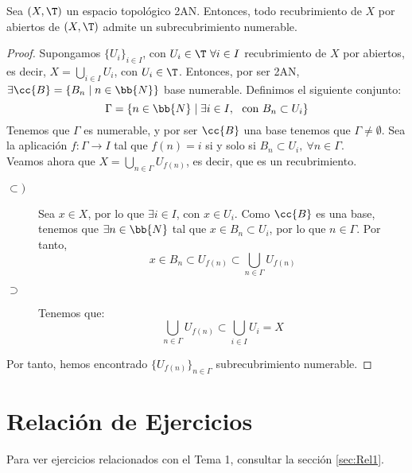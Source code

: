 \begin{prop}
    Sea $(X,\T)$ un espacio topológico 2AN. Entonces, todo recubrimiento de $X$ por abiertos de $(X,\T)$ admite un subrecubrimiento numerable.
\end{prop}
\begin{proof}
    Supongamos $\{U_i\}_{i\in I}$, con $U_i\in \T~\forall i\in I$ recubrimiento de $X$ por abiertos, es decir, $X=\bigcup\limits_{i\in I} U_i$, con $U_i\in \T$. Entonces, por ser 2AN, $\exists \cc{B}=\{B_n\mid n\in \bb{N}\}$ base numerable. Definimos el siguiente conjunto:
    \begin{equation*}
        \Gamma = \{n\in \bb{N}\mid \exists i\in I,~\text{ con }B_n\subset U_i\}
    \end{equation*}
    Tenemos que $\Gamma$ es numerable, y por ser $\cc{B}$ una base tenemos que $\Gamma\neq \emptyset$. Sea la aplicación $f:\Gamma\to I$ tal que $f(n)=i$ si y solo si $B_{n}\subset U_{i},~\forall n\in \Gamma$.\\

    Veamos ahora que $X=\bigcup\limits_{n\in \Gamma}U_{f(n)}$, es decir, que es un recubrimiento.
    \begin{description}
        \item[$\subset)$] Sea $x\in X$, por lo que $\exists i\in I$, con $x\in U_i$. Como $\cc{B}$ es una base, tenemos que $\exists n\in \bb{N}$ tal que $x\in B_n\subset U_i$, por lo que $n\in \Gamma$. Por tanto, $$x\in B_n\subset U_{f(n)} \subset \bigcup\limits_{n\in \Gamma}U_{f(n)}$$

        \item[$\supset$] Tenemos que:
        $$\bigcup\limits_{n\in \Gamma}U_{f(n)} \subset \bigcup\limits_{i\in I}U_{i}=X$$
    \end{description}

    Por tanto, hemos encontrado $\{U_{f(n)}\}_{n\in \Gamma}$ subrecubrimiento numerable.
\end{proof}

\section{Relación de Ejercicios}
Para ver ejercicios relacionados con el Tema 1, consultar la sección \ref{sec:Rel1}.